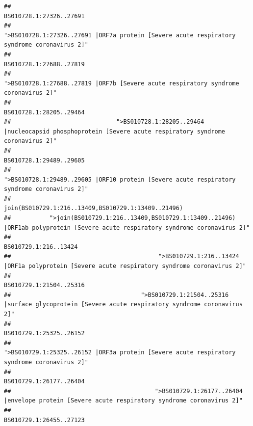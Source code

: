 \documentclass[
]{article}
\begin{document}
\begin{verbatim}
##                                                                                                                BS010728.1:27326..27691 
##                                            ">BS010728.1:27326..27691 |ORF7a protein [Severe acute respiratory syndrome coronavirus 2]" 
##                                                                                                                BS010728.1:27688..27819 
##                                                    ">BS010728.1:27688..27819 |ORF7b [Severe acute respiratory syndrome coronavirus 2]" 
##                                                                                                                BS010728.1:28205..29464 
##                              ">BS010728.1:28205..29464 |nucleocapsid phosphoprotein [Severe acute respiratory syndrome coronavirus 2]" 
##                                                                                                                BS010728.1:29489..29605 
##                                            ">BS010728.1:29489..29605 |ORF10 protein [Severe acute respiratory syndrome coronavirus 2]" 
##                                                                                    join(BS010729.1:216..13409,BS010729.1:13409..21496) 
##           ">join(BS010729.1:216..13409,BS010729.1:13409..21496) |ORF1ab polyprotein [Severe acute respiratory syndrome coronavirus 2]" 
##                                                                                                                  BS010729.1:216..13424 
##                                          ">BS010729.1:216..13424 |ORF1a polyprotein [Severe acute respiratory syndrome coronavirus 2]" 
##                                                                                                                BS010729.1:21504..25316 
##                                     ">BS010729.1:21504..25316 |surface glycoprotein [Severe acute respiratory syndrome coronavirus 2]" 
##                                                                                                                BS010729.1:25325..26152 
##                                            ">BS010729.1:25325..26152 |ORF3a protein [Severe acute respiratory syndrome coronavirus 2]" 
##                                                                                                                BS010729.1:26177..26404 
##                                         ">BS010729.1:26177..26404 |envelope protein [Severe acute respiratory syndrome coronavirus 2]" 
##                                                                                                                BS010729.1:26455..27123 

\end{verbatim}
\end{document}
